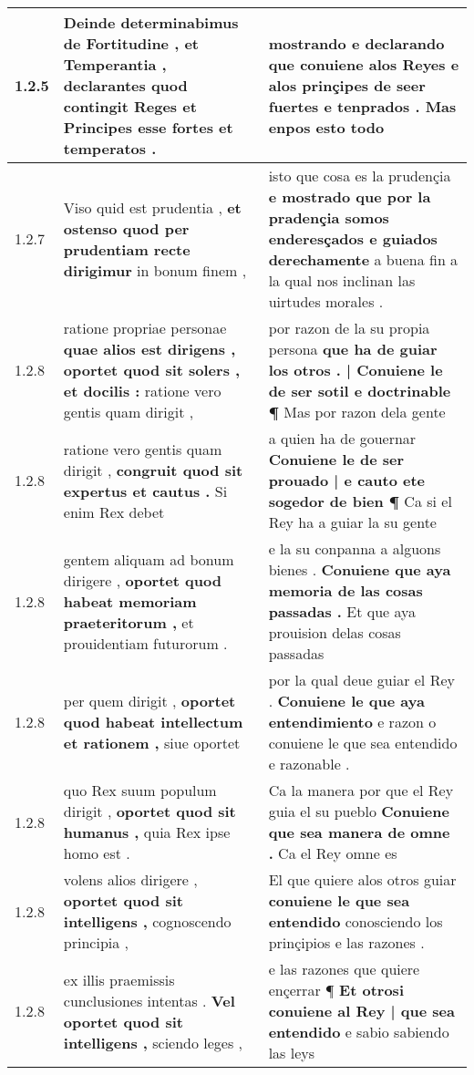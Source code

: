 \begin{tabular}{|p{1cm}|p{6.5cm}|p{6.5cm}|}
1.2.5 & Deinde determinabimus de Fortitudine , et Temperantia , \textbf{ declarantes quod contingit Reges } et Principes esse fortes et temperatos . & mostrando e declarando \textbf{ que conuiene alos Reyes e alos prinçipes de seer fuertes e tenprados . } Mas enpos esto todo \\\hline
1.2.7 & Viso quid est prudentia , \textbf{ et ostenso quod per prudentiam recte dirigimur } in bonum finem , & isto que cosa es la prudençia \textbf{ e mostrado que por la pradençia somos enderesçados e guiados derechamente } a buena fin a la qual nos inclinan las uirtudes morales . \\\hline
1.2.8 & ratione propriae personae \textbf{ quae alios est dirigens , oportet quod sit solers , et docilis : } ratione vero gentis quam dirigit , & por razon de la su propia persona \textbf{ que ha de guiar los otros . | Conuiene le de ser sotil e doctrinable ¶ } Mas por razon dela gente \\\hline
1.2.8 & ratione vero gentis quam dirigit , \textbf{ congruit quod sit expertus et cautus . } Si enim Rex debet & a quien ha de gouernar \textbf{ Conuiene le de ser prouado | e cauto ete sogedor de bien ¶ } Ca si el Rey ha a guiar la su gente \\\hline
1.2.8 & gentem aliquam ad bonum dirigere , \textbf{ oportet quod habeat memoriam praeteritorum , } et prouidentiam futurorum . & e la su conpanna a alguons bienes . \textbf{ Conuiene que aya memoria de las cosas passadas . } Et que aya prouision delas cosas passadas \\\hline
1.2.8 & per quem dirigit , \textbf{ oportet quod habeat intellectum et rationem , } siue oportet & por la qual deue guiar el Rey . \textbf{ Conuiene le que aya entendimiento } e razon o conuiene le que sea entendido e razonable . \\\hline
1.2.8 & quo Rex suum populum dirigit , \textbf{ oportet quod sit humanus , } quia Rex ipse homo est . & Ca la manera por que el Rey guia el su pueblo \textbf{ Conuiene que sea manera de omne . } Ca el Rey omne es \\\hline
1.2.8 & volens alios dirigere , \textbf{ oportet quod sit intelligens , } cognoscendo principia , & El que quiere alos otros guiar \textbf{ conuiene le que sea entendido } conosciendo los prinçipios e las razones . \\\hline
1.2.8 & ex illis praemissis cunclusiones intentas . \textbf{ Vel oportet quod sit intelligens , } sciendo leges , & e las razones que quiere ençerrar ¶ \textbf{ Et otrosi conuiene al Rey | que sea entendido } e sabio sabiendo las leys \\\hline

\end{tabular}
